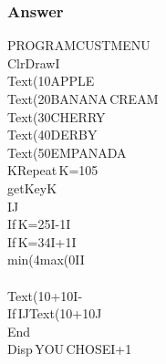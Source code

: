 \begin{frame}
\frametitle{Answer}

\hspace{-1cm}
\begin{minipage}{0.44\textwidth}
	\begin{ticalc}[6.7cm]
		PROGRAM\:CUSTMENU\\%
		\:ClrDraw\>I\\%
		\:Text(10\comma\qt APPLE\\%
		\:Text(20\comma\qt BANANA\,CREAM\\%
		\:Text(30\comma\qt CHERRY\\%
		\:Text(40\comma\qt DERBY\\%
		\:Text(50\comma\qt EMPANADA\\%
		\>K\:Repeat\,K=105\\%
		\:getKey\>K\\%
		\:I\>J\\%
		\:If\,K=25\:I-1\>I\\%
		\:If\,K=34\:I+1\>I\\%
		\:min(4\comma max(0\comma I\>I\\%
		\:\\%
		\:Text(10+10I\comma\qt-\\%
		\:If\,I\!J\:Text(10+10J\comma\qt\tiSpace\tiSpace\tiSpace\\%
		\:End\\%
		\:Disp\,\qt YOU\,CHOSE\qt\comma I+1
	\end{ticalc}
\end{minipage}



\end{frame}


